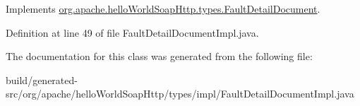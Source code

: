 Implements \hyperlink{interfaceorg_1_1apache_1_1hello_world_soap_http_1_1types_1_1_fault_detail_document_a2db3a02bc3400b5082f96375064f3ae8}{org.\+apache.\+hello\+World\+Soap\+Http.\+types.\+Fault\+Detail\+Document}.



Definition at line 49 of file Fault\+Detail\+Document\+Impl.\+java.



The documentation for this class was generated from the following file\+:\begin{DoxyCompactItemize}
\item 
build/generated-\/src/org/apache/hello\+World\+Soap\+Http/types/impl/Fault\+Detail\+Document\+Impl.\+java\end{DoxyCompactItemize}
